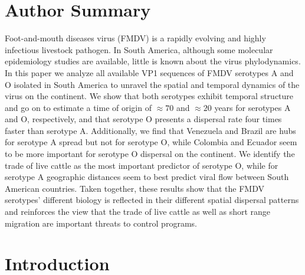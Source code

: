 \documentclass[10pt]{article}
\begin{document}
\section*{Author Summary} %
Foot-and-mouth diseases virus (FMDV) is a rapidly evolving and highly infectious livestock pathogen.
In South America, although some molecular epidemiology studies are available, little is known about the virus phylodynamics.
In this paper we analyze all available VP1 sequences of FMDV serotypes A and O isolated in South America to unravel the spatial and temporal dynamics of the virus on the continent.
We show that both serotypes exhibit temporal structure and go on to estimate a time of origin of $\approx 70$ and $\approx 20$ years for serotypes A and O, respectively, and that serotype O presents a dispersal rate four times faster than serotype A.
Additionally, we find that Venezuela and Brazil are hubs for serotype A spread but not for serotype O, while Colombia and Ecuador seem to be more important for serotype O dispersal on the continent.
We identify the trade of live cattle as the most important predictor of serotype O, while for serotype A geographic distances seem to best predict viral flow between South American countries.
Taken together, these results show that the FMDV serotypes' different biology is reflected in their different spatial dispersal patterns and reinforces the view that the trade of live cattle as well as short range migration are important threats to control programs.   

\section*{Introduction}
\end{document}
